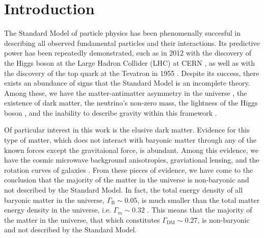 \chapter{Introduction}

The Standard Model of particle physics has been phenomenally succesful in describing all observed fundamental particles and their interactions. Its predictive power has been repeatedly demonstrated, such as in 2012 with the discovery of the Higgs boson at the Large Hadron Collider (LHC) at CERN \cite{collaborationObservationNewBoson2012}, as well as with the discovery of the top quark at the Tevatron in 1955 \cite{abachiObservationTopQuark1995}. Despite its success, there exists an abundance of signs that the Standard Model is an incomplete theory. Among these, we have the matter-antimatter asymmetry in the universe \cite{}, the existence of dark matter, the neutrino's non-zero mass, the lightness of the Higgs boson \cite{saikumarExploringFrontiersChallenges2024}, and the inability to describe gravity within this framework \cite{}.

Of particular interest in this work is the elusive dark matter. Evidence for this type of matter, which does not interact with baryonic matter through any of the known forces except the gravitaional force, is abundant. Among this evidence, we have the cosmic microwave background anisotropies, graviational lensing, and the rotation curves of galaxies \cite{}. From these pieces of evidence, we have come to the conclusion that the majority of the matter in the universe is non-baryonic and not described by the Standard Model. In fact, the total energy density of all baryonic matter in the universe, $\Gamma_{\text{B}} \sim 0.05$, is much smaller than the total matter energy density in the universe, i.e. $\Gamma_{m} \sim 0.32$ \cite{}. This means that the majority of the matter in the universe, that which constitutes $\Gamma_{\text{DM}} \sim 0.27$, is non-baryonic and not described by the Standard Model.
